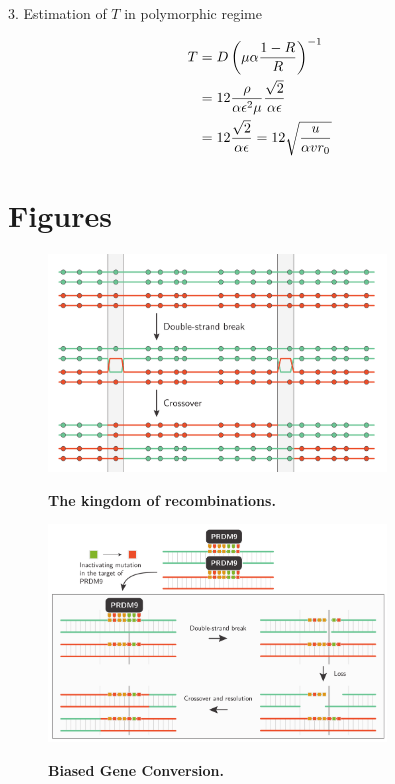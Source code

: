 \documentclass{article}
\begin{document}
3. Estimation of $ T $ in polymorphic regime

\begin{align}
   T &= D \left( \mu \alpha \dfrac{1-R }{R }   \right)^{-1} \\
    &=  12 \dfrac{\rho}{\alpha \epsilon^2 \mu} \dfrac{\sqrt{2}}{ \alpha  \epsilon } \\
    &=  12 \dfrac{\sqrt{2}}{ \alpha  \epsilon } =  12 \sqrt{\dfrac{u }{\alpha v r_0}}
\end{align}

\part*{Figures}

\begin{figure}[!ht]
	  \centering
       \includegraphics[width=0.8\textwidth]{Images/recombination.pdf}\\
		\caption{ \textbf{ The kingdom of recombinations.} 
}
\end{figure}

\begin{figure}[!ht]
	  \centering
       \includegraphics[width=0.8\textwidth]{Images/dBGC.pdf}\\
		\caption{ \textbf{ Biased Gene Conversion.} 
}
\end{figure}
\end{document}
